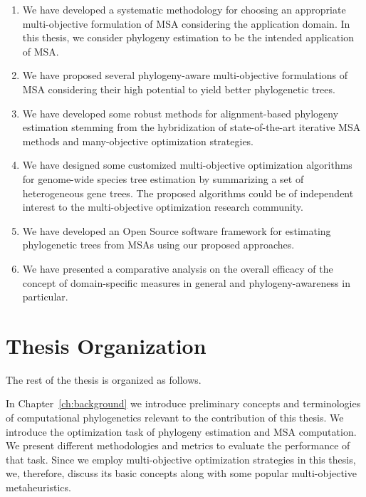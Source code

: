 \begin{enumerate}
\item We have developed a systematic methodology for choosing an appropriate multi-objective formulation of MSA considering the application domain. In this thesis, we consider phylogeny estimation to be the intended application of MSA.

\item We have proposed several phylogeny-aware multi-objective formulations of MSA considering their high potential to yield better phylogenetic trees.

\item We have developed some robust methods for alignment-based phylogeny estimation stemming from the hybridization of state-of-the-art iterative MSA methods and many-objective optimization strategies. 

\item We have designed some customized multi-objective optimization algorithms for genome-wide species tree estimation by summarizing a set of heterogeneous gene trees. The proposed algorithms could be of independent interest to the multi-objective optimization research community.

\item We have developed an Open Source software framework for estimating phylogenetic trees from MSAs using our proposed approaches.

\item We have presented a comparative analysis on the overall efficacy of the concept of domain-specific measures in general and phylogeny-awareness in particular.
\end{enumerate}


\section{Thesis Organization}

The rest of the thesis is organized as follows.

In Chapter~\ref{ch:background} we introduce preliminary concepts and terminologies of computational phylogenetics
relevant to the contribution of this thesis. We introduce the optimization task of phylogeny estimation and MSA computation. We present different methodologies and metrics to evaluate the performance of that task. Since we employ multi-objective optimization strategies in this thesis, we, therefore, discuss its basic concepts along with some popular multi-objective metaheuristics.

